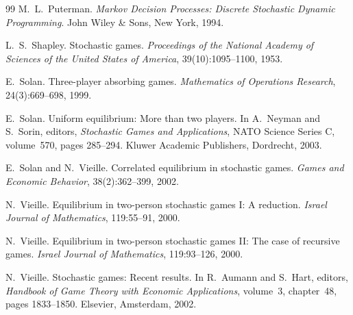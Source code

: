 \documentclass[12pt]{article}
\theoremstyle{definition}
\newcommand{\1}{\mathbf{1}}
\begin{document}
\begin{thebibliography}{99}
M.~L.~Puterman.
\newblock \emph{Markov Decision Processes: Discrete Stochastic Dynamic
Programming}.
\newblock John Wiley \& Sons, New York, 1994.

L.~S.~Shapley.
\newblock Stochastic games.
\newblock \emph{Proceedings of the National Academy of Sciences of the United
States of America}, 39(10):1095--1100, 1953.

E.~Solan.
\newblock Three-player absorbing games.
\newblock \emph{Mathematics of Operations Research}, 24(3):669--698, 1999.

E.~Solan.
\newblock Uniform equilibrium: More than two players.
\newblock In A.~Neyman and S.~Sorin, editors, \emph{Stochastic Games and
Applications}, NATO Science Series C, volume~570, pages 285--294. Kluwer Academic
Publishers, Dordrecht, 2003.

E.~Solan and N.~Vieille.
\newblock Correlated equilibrium in stochastic games.
\newblock \emph{Games and Economic Behavior}, 38(2):362--399, 2002.

N.~Vieille.
\newblock Equilibrium in two-person stochastic games {I}: A reduction.
\newblock \emph{Israel Journal of Mathematics}, 119:55--91, 2000.

N.~Vieille.
\newblock Equilibrium in two-person stochastic games {II}: The case of recursive
games.
\newblock \emph{Israel Journal of Mathematics}, 119:93--126, 2000.

N.~Vieille.
\newblock Stochastic games: Recent results.
\newblock In R.~Aumann and S.~Hart, editors, \emph{Handbook of Game Theory with
Economic Applications}, volume~3, chapter~48, pages 1833--1850. Elsevier,
Amsterdam, 2002.

\end{thebibliography}
\end{document}
